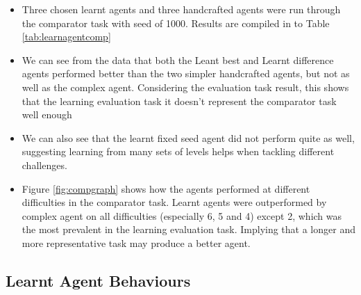 
\begin{itemize}
\item Three chosen learnt agents and three handcrafted agents were run through the comparator task with seed of 1000. Results are compiled in to Table \ref{tab:learnagentcomp}
\item We can see from the data that both the Leant best and Learnt difference agents performed better than the two simpler handcrafted agents, but not as well as the complex agent. Considering the evaluation task result, this shows that the learning evaluation task it doesn't represent the comparator task well enough
\item We can also see that the learnt fixed seed agent did not perform quite as well, suggesting learning from many sets of levels helps when tackling different challenges.
\item Figure \ref{fig:compgraph} shows how the agents performed at different difficulties in the comparator task. Learnt agents were outperformed by complex agent on all difficulties (especially 6, 5 and 4) except 2, which was the most prevalent in the learning evaluation task. Implying that a longer and more representative task may produce a better agent.
\end{itemize}


\subsection{Learnt Agent Behaviours}

